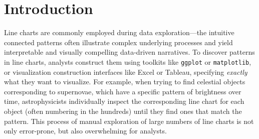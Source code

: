\vspace{-10pt}
\section{Introduction\label{sec:intro}}
Line charts are commonly employed during data exploration---the 
intuitive connected patterns 
often illustrate complex underlying processes
and yield interpretable and visually compelling data-driven
narratives. 
To discover patterns in line charts,
analysts construct them
using toolkits like {\tt ggplot} or {\tt matplotlib},
or visualization construction interfaces
like Excel or Tableau, specifying 
{\em exactly} what they want to visualize.
For example, when trying to find celestial objects 
corresponding to supernovae, which have a specific pattern
of brightness over time, astrophysicists 
individually inspect the corresponding line chart 
for each object (often numbering in the hundreds) 
until they find ones that match the pattern.  
This process of manual exploration of
large numbers of line charts 
is not only error-prone, but also overwhelming for 
analysts.

